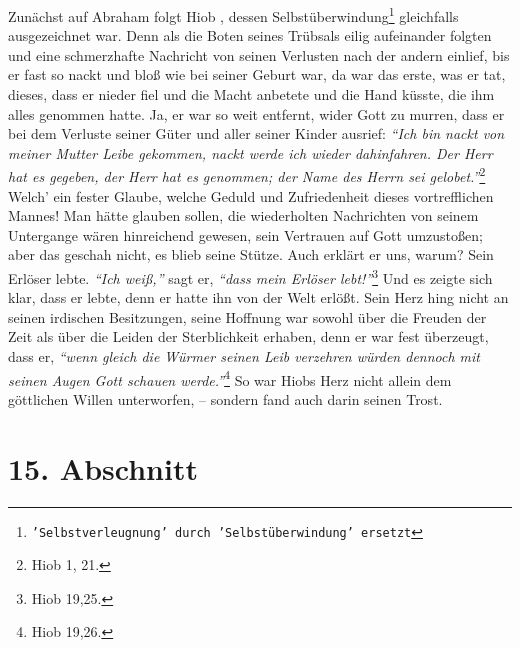Zunächst auf Abraham folgt Hiob , dessen
Selbstüberwindung\footnote{\texttt{'Selbstverleugnung' durch 'Selbstüberwindung'
ersetzt}} gleichfalls
ausgezeichnet war. Denn als die Boten seines Trübsals eilig aufeinander
folgten und eine schmerzhafte Nachricht von seinen Verlusten nach der andern
einlief, bis er fast so nackt und bloß wie bei seiner Geburt war, da war das
erste, was er tat, dieses, dass er nieder fiel und die Macht anbetete und die
Hand küsste, die ihm alles genommen hatte. Ja, er war so weit entfernt, wider
Gott zu murren, dass er bei dem Verluste seiner Güter und aller seiner Kinder
ausrief:
\textit{"`Ich bin nackt von meiner Mutter Leibe gekommen, nackt werde ich
wieder dahinfahren. Der Herr hat es gegeben, der Herr hat es genommen; der Name
des Herrn sei gelobet."'}\footnote{Hiob 1, 21.}
Welch' ein fester Glaube, welche
Geduld und Zufriedenheit dieses vortrefflichen Mannes! Man hätte glauben sollen,
die wiederholten Nachrichten von seinem Untergange wären hinreichend gewesen,
sein Vertrauen auf Gott umzustoßen; aber das geschah nicht, es blieb seine
Stütze. Auch erklärt er uns, warum? Sein Erlöser lebte.
\textit{"`Ich weiß,"'} sagt er,
\textit{"`dass mein Erlöser lebt!"'}\footnote{Hiob 19,25.}
Und es zeigte sich
klar, dass er lebte, denn er hatte ihn von der Welt erlößt. Sein Herz hing
nicht an seinen irdischen Besitzungen, seine Hoffnung war sowohl über die
Freuden der Zeit als über die Leiden der Sterblichkeit erhaben, denn er war fest
überzeugt, dass er,
\textit{"`wenn gleich die Würmer seinen Leib verzehren würden
dennoch mit seinen Augen Gott schauen werde."'}\footnote{Hiob 19,26.}
So war Hiobs
Herz nicht allein dem göttlichen Willen unterworfen, – sondern fand auch darin
seinen Trost. 

\section{15. Abschnitt} \label{kap4_ab15}

